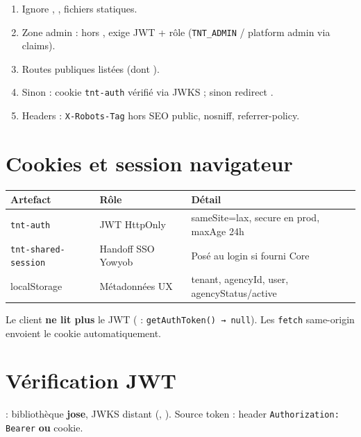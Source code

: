 \begin{enumerate}
  \item Ignore , , fichiers statiques.
  \item Zone admin : hors , exige JWT + rôle
        (\texttt{TNT\_ADMIN} / platform admin via claims).
  \item Routes publiques listées (dont ).
  \item Sinon : cookie \texttt{tnt-auth} vérifié via JWKS ; sinon redirect
        .
  \item Headers : \texttt{X-Robots-Tag} hors SEO public, nosniff, referrer-policy.
\end{enumerate}


\section{Cookies et session navigateur}

\begin{table}[h]
\centering
\begin{tabularx}{\textwidth}{@{}lXX@{}}
\toprule
\textbf{Artefact} & \textbf{Rôle} & \textbf{Détail} \\
\midrule
\texttt{tnt-auth} & JWT HttpOnly & sameSite=lax, secure en prod, maxAge 24h \\
\texttt{tnt-shared-session} & Handoff SSO Yowyob & Posé au login si fourni Core \\
localStorage & Métadonnées UX & tenant, agencyId, user, agencyStatus/active \\
\bottomrule
\end{tabularx}
\end{table}

Le client \textbf{ne lit plus} le JWT ( :
\texttt{getAuthToken() → null}). Les \texttt{fetch} same-origin envoient le
cookie automatiquement.

\section{Vérification JWT}

 : bibliothèque \textbf{jose}, JWKS distant
(, ). Source token :
header \texttt{Authorization: Bearer} \textbf{ou} cookie.

